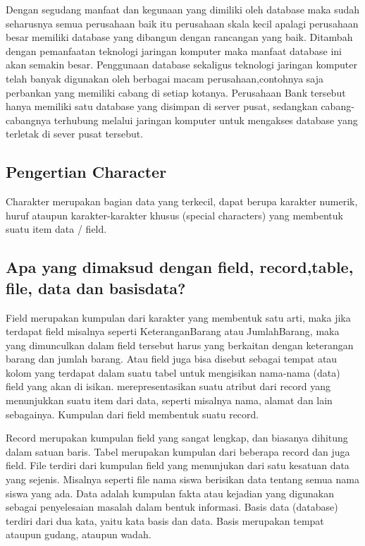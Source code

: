 	Dengan segudang manfaat dan kegunaan yang dimiliki oleh database maka sudah seharusnya semua perusahaan baik itu perusahaan skala kecil apalagi perusahaan besar memiliki database yang dibangun dengan rancangan yang baik. Ditambah dengan pemanfaatan teknologi jaringan komputer maka manfaat database ini akan semakin besar. Penggunaan database sekaligus teknologi jaringan komputer telah banyak digunakan oleh berbagai macam perusahaan,contohnya saja perbankan yang memiliki cabang di setiap kotanya. Perusahaan Bank tersebut hanya memiliki satu database yang disimpan di server pusat, sedangkan cabang-cabangnya terhubung melalui jaringan komputer untuk mengakses database yang terletak di sever pusat tersebut.


\subsection{Pengertian Character}
	Charakter merupakan bagian data yang terkecil, dapat berupa karakter numerik, huruf ataupun karakter-karakter khusus (special characters) yang membentuk suatu item data / field.

\subsection{{Apa yang dimaksud dengan ﬁeld, record,table, ﬁle, data dan basisdata?}} 
	Field merupakan kumpulan dari karakter yang membentuk satu arti, maka jika terdapat field misalnya seperti KeteranganBarang atau JumlahBarang, maka yang dimunculkan dalam field tersebut harus yang berkaitan dengan keterangan barang dan jumlah barang. Atau field juga bisa disebut sebagai tempat atau kolom yang terdapat dalam suatu tabel untuk mengisikan nama-nama (data) field yang akan di isikan. merepresentasikan suatu atribut dari record yang menunjukkan suatu item dari data, seperti misalnya nama, alamat dan lain sebagainya. Kumpulan dari field membentuk suatu record.

	Record merupakan kumpulan field yang sangat lengkap, dan biasanya dihitung dalam satuan baris. Tabel merupakan kumpulan dari beberapa record dan juga field. File terdiri dari kumpulan field yang menunjukan dari satu kesatuan data yang sejenis. Misalnya seperti file nama siswa berisikan data tentang semua nama siswa yang ada. Data adalah kumpulan fakta atau kejadian yang digunakan sebagai penyelesaian masalah dalam bentuk informasi. Basis data (database) terdiri dari dua kata, yaitu kata basis dan data. Basis merupakan tempat ataupun gudang, ataupun wadah.

